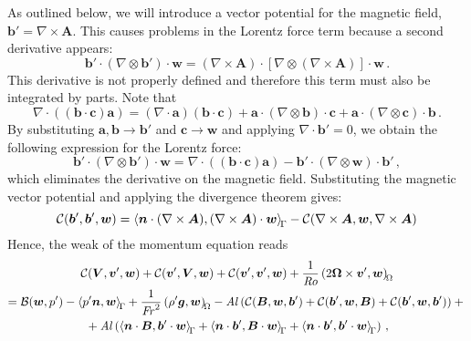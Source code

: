 As outlined below, we will introduce a vector potential for the magnetic field, \ie $\bm{b}'=\nabla\times\bm{A}$. This causes problems in the Lorentz force term because a second derivative appears:
\begin{equation}
	\bm{b}'\cdot(\nabla\otimes\bm{b}')\cdot\bm{w}=(\nabla\times\bm{A})\cdot[\nabla\otimes(\nabla\times\bm{A})]\cdot\bm{w}\,.
\end{equation}
This derivative is not properly defined and therefore this term must also be integrated by parts. Note that
\begin{equation}
	\nabla\cdot((\bm{b}\cdot\bm{c})\bm{a})=(\nabla\cdot\bm{a})(\bm{b}\cdot\bm{c})+\bm{a}\cdot(\nabla\otimes\bm{b})\cdot\bm{c}+\bm{a}\cdot(\nabla\otimes\bm{c})\cdot\bm{b}\,.
\end{equation}
By substituting $\bm{a},\bm{b}\rightarrow\bm{b}'$ and $\bm{c}\rightarrow\bm{w}$ and applying $\nabla\cdot\bm{b}'=0$, we obtain the following expression for the Lorentz force:
\begin{equation}
	\bm{b}'\cdot(\nabla\otimes\bm{b}')\cdot\bm{w}=\nabla\cdot((\bm{b}\cdot\bm{c})\bm{a})-\bm{b}'\cdot(\nabla\otimes\bm{w})\cdot\bm{b}'\,,
\end{equation}
which eliminates the derivative on the magnetic field. Substituting the magnetic vector potential and applying the divergence theorem gives:
\begin{equation}
	\mathcal{C}(\bm{b}', \bm{b}', \bm{w})=\left\langle\bm{n}\cdot(\nabla\times\bm{A}), (\nabla\times\bm{A})\cdot\bm{w}\right\rangle_{\!{\Gamma}}-\mathcal{C}(\nabla\times\bm{A}, \bm{w}, \nabla\times\bm{A})
\end{equation}
Hence, the weak of the momentum equation reads
\begin{multline}
	\mathcal{C}(\bm{V}, \bm{v}', \bm{w})+\mathcal{C}(\bm{v}', \bm{V}, \bm{w})+\mathcal{C}(\bm{v}', \bm{v}', \bm{w})+\frac{1}{\mathit{Ro}}\left(2\bm{\Omega}\times\bm{v}', \bm{w}\right)_{\!{\Omega}}\\
	=\mathcal{B}(\bm{w}, p')-\left\langle p'\bm{n}, \bm{w}\right\rangle_{\!{\Gamma}}+\frac{1}{\mathit{Fr}^2}\left(\rho'\bm{g}, \bm{w}\right)_{\!{\Omega}}-\mathit{Al}\left(\mathcal{C}(\bm{B}, \bm{w}, \bm{b}')+\mathcal{C}(\bm{b}', \bm{w}, \bm{B})+\mathcal{C}(\bm{b}', \bm{w}, \bm{b}')\right)+{}\\
	{}+\mathit{Al}\left(\left\langle\bm{n}\cdot\bm{B}, \bm{b}'\cdot\bm{w}\right\rangle_{\!{\Gamma}}+\left\langle\bm{n}\cdot\bm{b}', \bm{B}\cdot\bm{w}\right\rangle_{\!{\Gamma}}+\left\langle\bm{n}\cdot\bm{b}', \bm{b}'\cdot\bm{w}\right\rangle_{\!{\Gamma}}\right)\,,
\end{multline}


